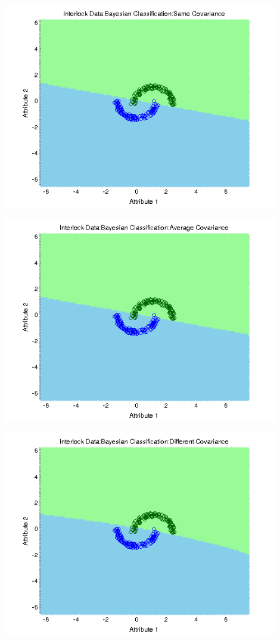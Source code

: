 \documentclass[a4paper]{article}
\begin{document}
			\centerline{\includegraphics[width=160mm,height=90mm]{plots/bayes/nls/interlock/same_cov.png}}
 			\centerline{\includegraphics[width=160mm,height=90mm]{plots/bayes/nls/interlock/avg_cov.png}}
 			\centerline{\includegraphics[width=160mm,height=90mm]{plots/bayes/nls/interlock/diff_cov.png}}
 					
\end{document}
